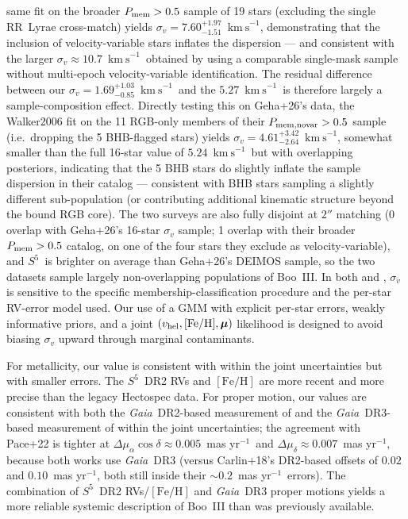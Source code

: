\documentclass[twocolumn, apj, numberedappendix, appendixfloats]{openjournal_dhayaa}
\newcommand{\SSSSS}{${S}^5$\xspace}
\newcommand{\gaia}{\textit{Gaia}\xspace}
\newcommand{\vlosUnits}{$\mathrm{km~s}^{-1}$\xspace}
\newcommand{\pmUnits}{mas yr$^{-1}$\xspace}
\begin{document}
same fit on the broader $P_{\rm mem} > 0.5$ sample of 19 stars (excluding the single RR~Lyrae cross-match) yields $\sigma_v = 7.60^{+1.97}_{-1.51}$~\vlosUnits, demonstrating that the inclusion of velocity-variable stars inflates the dispersion --- and consistent with the larger $\sigma_v \approx 10.7$~\vlosUnits\ obtained by \citet{Carlin2018} using a comparable single-mask sample without multi-epoch velocity-variable identification.  The residual difference between our $\sigma_v = 1.69^{+1.03}_{-0.85}$~\vlosUnits\ and the \citet{Geha2026} $5.27$~\vlosUnits\ is therefore largely a sample-composition effect.  Directly testing this on Geha+26's data, the Walker2006 fit on the 11 RGB-only members of their $P_{\rm mem,novar} > 0.5$ sample (i.e.\ dropping the 5 BHB-flagged stars) yields $\sigma_v = 4.61^{+3.42}_{-2.64}$~\vlosUnits, somewhat smaller than the full 16-star value of $5.24$~\vlosUnits\ but with overlapping posteriors, indicating that the 5 BHB stars do slightly inflate the sample dispersion in their catalog --- consistent with BHB stars sampling a slightly different sub-population (or contributing additional kinematic structure beyond the bound RGB core).  The two surveys are also fully disjoint at $2''$ matching (0 overlap with Geha+26's 16-star $\sigma_v$ sample; 1 overlap with their broader $P_{\rm mem} > 0.5$ catalog, on one of the four stars they exclude as velocity-variable), and \SSSSS\ is brighter on average than Geha+26's DEIMOS sample, so the two datasets sample largely non-overlapping populations of Boo~III. In both \citet{Carlin2018} and \citet{Geha2026}, $\sigma_v$ is sensitive to the specific membership-classification procedure and the per-star RV-error model used.  Our use of a GMM with explicit per-star errors, weakly informative priors, and a joint $(v_{\rm hel}, [\mathrm{Fe/H}], \boldsymbol\mu)$ likelihood is designed to avoid biasing $\sigma_v$ upward through marginal contaminants.

For metallicity, our value is consistent with \citet{Carlin2018} within the joint uncertainties but with smaller errors. The \SSSSS\ DR2 RVs and $[\mathrm{Fe/H}]$ are more recent and more precise than the legacy Hectospec data.  For proper motion, our values are consistent with both the \gaia~DR2-based measurement of \citet{Carlin2018} and the \gaia~DR3-based measurement of \citet{Pace2022} within the joint uncertainties; the agreement with Pace+22 is tighter at $\Delta\mu_\alpha\cos\delta \approx 0.005$~\pmUnits\ and $\Delta\mu_\delta \approx 0.007$~\pmUnits, because both works use \gaia\ DR3 (versus Carlin+18's DR2-based offsets of $0.02$ and $0.10$~\pmUnits, both still inside their $\sim 0.2$~\pmUnits\ errors). The combination of \SSSSS\ DR2 RVs/$[\mathrm{Fe/H}]$ and \gaia\ DR3 proper motions yields a more reliable systemic description of Boo~III than was previously available.
\end{document}
